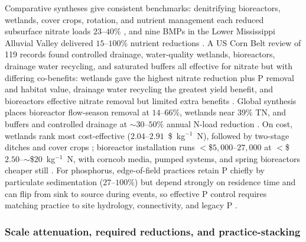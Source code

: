 \documentclass[11pt]{article}
\begin{document}
Comparative syntheses give consistent benchmarks: denitrifying bioreactors,
wetlands, cover crops, rotation, and nutrient management each reduced
subsurface nitrate loads $23$--$40\%$ \parencite{Yuan2022}, and nine BMPs in
the Lower Mississippi Alluvial Valley delivered $15$--$100\%$ nutrient
reductions \parencite{Kröger2012}. A US Corn Belt review of 119 records found
controlled drainage, water-quality wetlands, bioreactors, drainage water
recycling, and saturated buffers all effective for nitrate but with differing
co-benefits: wetlands gave the highest nitrate reduction plus P removal and
habitat value, drainage water recycling the greatest yield benefit, and
bioreactors effective nitrate removal but limited extra benefits
\parencite{Mitchell2023}. Global synthesis places bioreactor flow-season
removal at $14$--$66\%$, wetlands near $39\%$ TN, and buffers and controlled
drainage at $\sim30$--$50\%$ annual N-load reduction \parencite{Wang2025b}. On
cost, wetlands rank most cost-effective ($2.04$--$2.91$~\$~kg$^{-1}$~N),
followed by two-stage ditches and cover crops
\parencite{Roley2016,Messer2021}; bioreactor installation runs
$<$\$$5{,}000$--$27{,}000$ at $<$\$$2.50$--$\sim$\$$20$~kg$^{-1}$~N, with
corncob media, pumped systems, and spring bioreactors cheaper still
\parencite{Christianson2021,Law2023,Hartfiel2024,Easton2019}. For phosphorus,
edge-of-field practices retain P chiefly by particulate sedimentation
($27$--$100\%$) but depend strongly on residence time and can flip from sink
to source during events, so effective P control requires matching practice to
site hydrology, connectivity, and legacy P
\parencite{Mendes2020,Kröger2013,Singh2020c,King2015,Ni2020}.

\subsubsection{Scale attenuation, required reductions, and practice-stacking}
\end{document}
